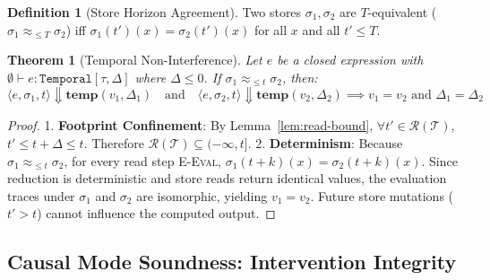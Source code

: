 \documentclass[11pt,a4paper]{article}
\theoremstyle{definition}
\newtheorem{definition}{Definition}[section]
\theoremstyle{plain}
\newtheorem{theorem}{Theorem}[section]
\newcommand{\ty}[1]{\texttt{#1}}
\newcommand{\evals}{\Downarrow}
\newcommand{\Temp}{\ty{Temporal}}
\begin{document}
\begin{definition}[Store Horizon Agreement]
Two stores $\sigma_1, \sigma_2$ are $T$-equivalent ($\sigma_1 \approx_{\le T} \sigma_2$) iff $\sigma_1(t')(x) = \sigma_2(t')(x)$ for all $x$ and all $t' \le T$.
\end{definition}

\begin{theorem}[Temporal Non-Interference]
Let $e$ be a closed expression with $\emptyset \vdash e : \Temp[\tau, \Delta]$ where $\Delta \le 0$.
If $\sigma_1 \approx_{\le t} \sigma_2$, then:
\[
\langle e, \sigma_1, t \rangle \evals \mathbf{temp}(v_1, \Delta_1) \quad \text{and} \quad \langle e, \sigma_2, t \rangle \evals \mathbf{temp}(v_2, \Delta_2) \implies v_1 = v_2 \text{ and } \Delta_1 = \Delta_2
\]
\end{theorem}
\begin{proof}
1. \textbf{Footprint Confinement}: By Lemma~\ref{lem:read-bound}, $\forall t' \in \mathcal{R}(\mathcal{T})$, $t' \le t + \Delta \le t$. Therefore $\mathcal{R}(\mathcal{T}) \subseteq (-\infty, t]$.
2. \textbf{Determinism}: Because $\sigma_1 \approx_{\le t} \sigma_2$, for every read step \textsc{E-Eval}, $\sigma_1(t+k)(x) = \sigma_2(t+k)(x)$.
Since reduction is deterministic and store reads return identical values, the evaluation traces under $\sigma_1$ and $\sigma_2$ are isomorphic, yielding $v_1 = v_2$.
Future store mutations ($t' > t$) cannot influence the computed output.
\end{proof}

\subsection{Causal Mode Soundness: Intervention Integrity}
\end{document}
